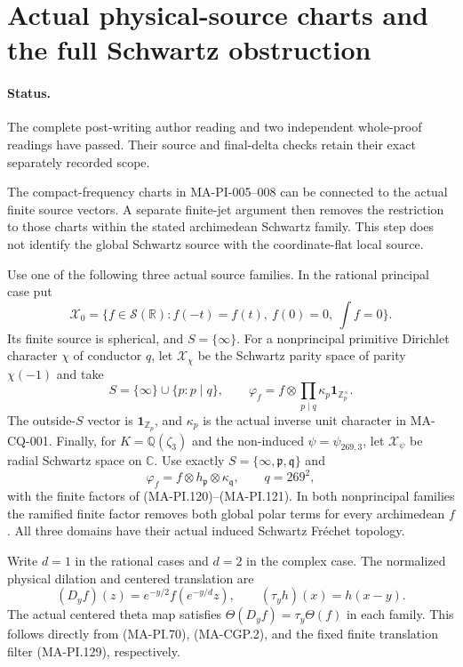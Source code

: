 \section{Actual physical-source charts and the full Schwartz obstruction}
\label{sec:full-schwartz-cutoff-obstruction}

\paragraph{Status.}
The complete post-writing author reading and two independent
whole-proof readings have passed.  Their source and final-delta
checks retain their exact separately recorded scope.

The compact-frequency charts in MA-PI-005--008 can be connected
to the actual finite source vectors.  A separate finite-jet
argument then removes the restriction to those charts within
the stated archimedean Schwartz family.  This step does not
identify the global Schwartz source with the coordinate-flat
local source.

Use one of the following three actual source families.
In the rational principal case put
\[
 \mathscr X_0=\{f\in\mathcal S(\mathbb R):f(-t)=f(t),
                         \ f(0)=0,\ \int f=0\}.
 \tag{MA-PI.190}
\]
Its finite source is spherical, and $S=\{\infty\}$.
For a nonprincipal primitive Dirichlet character $\chi$ of
conductor $q$, let $\mathscr X_\chi$ be the Schwartz parity
space of parity $\chi(-1)$ and take
\[
 S=\{\infty\}\cup\{p:p\mid q\},\qquad
 \varphi_f=f\otimes\prod_{p\mid q}
                  \kappa_p\mathbf1_{\mathbb Z_p^\times}.
 \tag{MA-PI.191}
\]
The outside-$S$ vector is $\mathbf1_{\mathbb Z_p}$, and
$\kappa_p$ is the actual inverse unit character in MA-CQ-001.
Finally, for $K=\mathbb Q(\zeta_3)$ and the non-induced
$\psi=\psi_{269,3}$, let $\mathscr X_\psi$ be radial
Schwartz space on $\mathbb C$.  Use exactly
$S=\{\infty,\mathfrak p,\mathfrak q\}$ and
\[
 \varphi_f=f\otimes h_{\mathfrak p}\otimes\kappa_{\mathfrak q},
 \qquad q=269^2,
 \tag{MA-PI.192}
\]
with the finite factors of (MA-PI.120)--(MA-PI.121).
In both nonprincipal families the ramified finite factor
removes both global polar terms for every archimedean $f$.
All three domains have their actual induced Schwartz
Fr\'echet topology.

Write $d=1$ in the rational cases and $d=2$ in the complex
case.  The normalized physical dilation and centered
translation are
\[
 (D_yf)(z)=e^{-y/2}f(e^{-y/d}z),\qquad
 (\tau_yh)(x)=h(x-y).
 \tag{MA-PI.193}
\]
The actual centered theta map satisfies
$\Theta(D_yf)=\tau_y\Theta(f)$ in each family.  This follows
directly from (MA-PI.70), (MA-CGP.2), and the fixed finite
translation filter (MA-PI.129), respectively.

